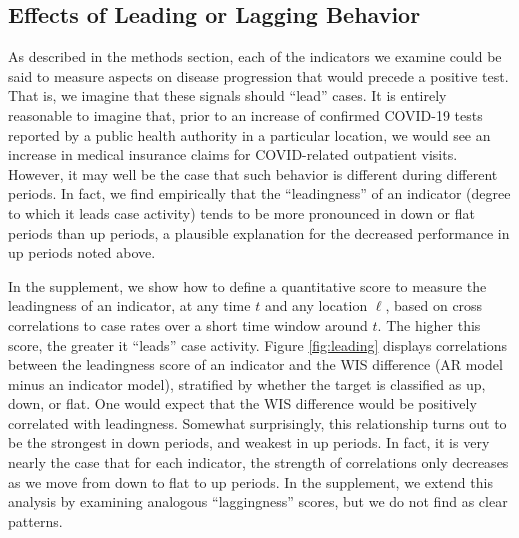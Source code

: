 \documentclass[9pt,twocolumn,twoside,lineno]{pnas-new}
\begin{document}

\subsection{Effects of Leading or Lagging Behavior}

As described in the methods section, each of the indicators we examine could be
said to measure aspects on disease progression that would precede a positive
test. That is, we imagine that these signals should ``lead'' cases. It is
entirely reasonable to imagine that, prior to an increase of confirmed COVID-19
tests reported by a public health authority in a particular location, we would
see an increase in medical insurance claims for COVID-related outpatient
visits. However, it may well be the case that such behavior is different
during different periods. In fact, we find empirically that the ``leadingness''
of an indicator (degree to which it leads case activity) tends to be more
pronounced in down or flat periods than up periods, a plausible explanation
for the decreased performance in up periods noted above.

In the supplement, we show how to define a quantitative score to measure the
leadingness of an indicator, at any time $t$ and any location $\ell$, based on
cross correlations to case rates over a short time window around $t$.
The higher this score, the greater it ``leads'' case activity.  Figure 
\ref{fig:leading} displays correlations between the leadingness score of an 
indicator and the WIS difference (AR model minus an indicator model), stratified
by whether the target is classified as up, down, or flat.  One would expect that  
the WIS difference would be positively correlated with leadingness.  Somewhat
surprisingly, this relationship turns out to be the strongest in down periods,
and weakest in up periods.  In fact, it is very nearly the case that for each
indicator, the strength of correlations only decreases as we move from down to
flat to up  periods.  In the supplement, we extend this analysis by examining
analogous ``laggingness'' scores, but we do not find as clear patterns. 
\end{document}
